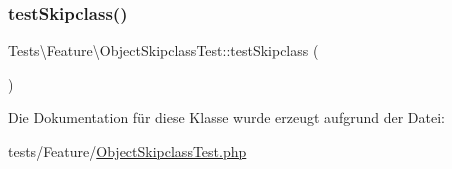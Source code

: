 \subsubsection{\texorpdfstring{test\+Skipclass()}{testSkipclass()}}
{\footnotesize\ttfamily Tests\textbackslash{}\+Feature\textbackslash{}\+Object\+Skipclass\+Test\+::test\+Skipclass (\begin{DoxyParamCaption}{ }\end{DoxyParamCaption})}



Die Dokumentation für diese Klasse wurde erzeugt aufgrund der Datei\+:\begin{DoxyCompactItemize}
\item 
tests/\+Feature/\hyperlink{ObjectSkipclassTest_8php}{Object\+Skipclass\+Test.\+php}\end{DoxyCompactItemize}

